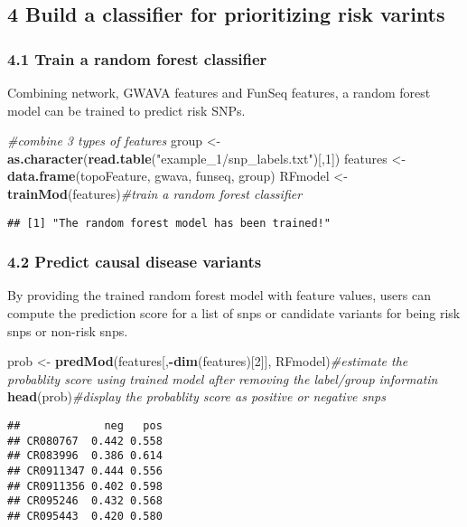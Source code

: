 \documentclass[]{article}
\newenvironment{Shaded}{\begin{snugshade}}{\end{snugshade}}
\newcommand{\KeywordTok}[1]{\textcolor[rgb]{0.13,0.29,0.53}{\textbf{#1}}}
\newcommand{\DecValTok}[1]{\textcolor[rgb]{0.00,0.00,0.81}{#1}}
\newcommand{\StringTok}[1]{\textcolor[rgb]{0.31,0.60,0.02}{#1}}
\newcommand{\CommentTok}[1]{\textcolor[rgb]{0.56,0.35,0.01}{\textit{#1}}}
\newcommand{\OperatorTok}[1]{\textcolor[rgb]{0.81,0.36,0.00}{\textbf{#1}}}
\newcommand{\NormalTok}[1]{#1}
\begin{document}
\subsection{4 Build a classifier for prioritizing risk
varints}\label{build-a-classifier-for-prioritizing-risk-varints}

\subsubsection{4.1 Train a random forest
classifier}\label{train-a-random-forest-classifier}

Combining network, GWAVA features and FunSeq features, a random forest
model can be trained to predict risk SNPs.

\begin{Shaded}
\begin{Highlighting}[]
\CommentTok{#combine 3 types of features}
\NormalTok{group <-}\StringTok{ }\KeywordTok{as.character}\NormalTok{(}\KeywordTok{read.table}\NormalTok{(}\StringTok{"example_1/snp_labels.txt"}\NormalTok{)[,}\DecValTok{1}\NormalTok{])}
\NormalTok{features <-}\StringTok{ }\KeywordTok{data.frame}\NormalTok{(topoFeature, gwava, funseq, group)}
\NormalTok{RFmodel <-}\StringTok{ }\KeywordTok{trainMod}\NormalTok{(features)}\CommentTok{#train a random forest classifier}
\end{Highlighting}
\end{Shaded}

\begin{verbatim}
## [1] "The random forest model has been trained!"
\end{verbatim}

\subsubsection{4.2 Predict causal disease
variants}\label{predict-causal-disease-variants}

By providing the trained random forest model with feature values, users
can compute the prediction score for a list of snps or candidate
variants for being risk snps or non-risk snps.

\begin{Shaded}
\begin{Highlighting}[]
\NormalTok{prob <-}\StringTok{ }\KeywordTok{predMod}\NormalTok{(features[,}\OperatorTok{-}\KeywordTok{dim}\NormalTok{(features)[}\DecValTok{2}\NormalTok{]], RFmodel)}\CommentTok{#estimate the probablity score using trained model after removing the label/group informatin}
\KeywordTok{head}\NormalTok{(prob)}\CommentTok{#display the probablity score as positive or negative snps}
\end{Highlighting}
\end{Shaded}

\begin{verbatim}
##             neg   pos
## CR080767  0.442 0.558
## CR083996  0.386 0.614
## CR0911347 0.444 0.556
## CR0911356 0.402 0.598
## CR095246  0.432 0.568
## CR095443  0.420 0.580
\end{verbatim}
\end{document}
